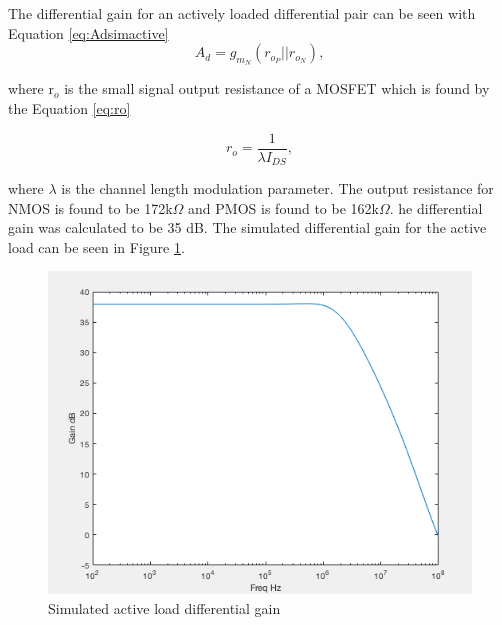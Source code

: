 The differential gain for an actively loaded differential pair can be seen with Equation \ref{eq:Adsimactive}
\begin{equation}
A_d = g_{m_N}(r_{o_P}||r_{o_N}),
\label{eqn:Ad_Active_Load}
\end{equation}

where  r$_o$ is the small signal output resistance of a MOSFET which is found by the Equation \ref{eq:ro}

\begin{equation}
r_o = \frac{1}{\lambda I_{DS}},
\label{eqn:ro}
\end{equation}

where  $\lambda$ is the channel length modulation parameter. The output resistance for NMOS is found to be 172k$\Omega$ and PMOS is found to be 162k$\Omega$. he differential gain was calculated to be 35 dB. The simulated differential gain for the active load can be seen in Figure \ref{fig:activeAdsim}.


\begin{figure}[H]
    \begin{center}
    \includegraphics[scale=.40]{Simulations/gainsecondstage.png}
    \caption{Simulated active load differential gain}
    \label{fig:activeAdsim}
    \end{center}
\end{figure}

